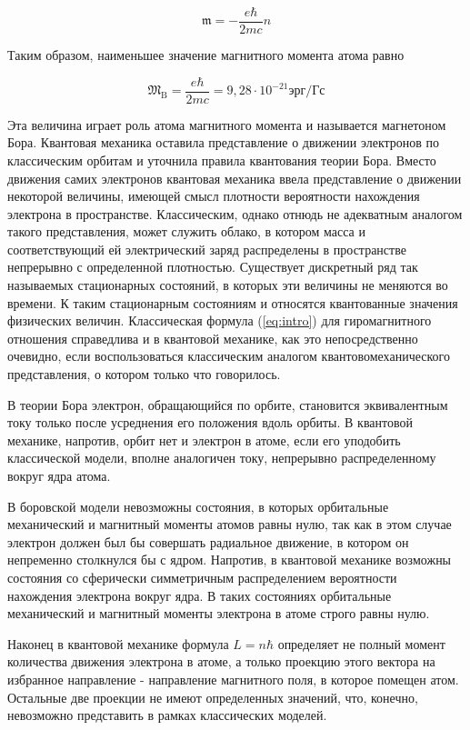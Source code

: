 \documentclass[12pt]{article}
\begin{document}
  \begin{equation}
    \mathfrak{m}=-\frac{e \hbar}{2 m c} n
  \end{equation}


  Таким образом, наименьшее значение магнитного момента атома равно

  \begin{equation}
    \mathfrak{M}_{\mathrm{B}}=\frac{e \hbar}{2 m c}=9,28 \cdot 10^{-21} \text{эрг} / \text{Гс}
  \end{equation}

  Эта величина играет роль атома магнитного момента и называется магнетоном Бора.
  Квантовая механика оставила представление о движении электронов по классическим орбитам и уточнила правила квантования теории Бора. Вместо движения самих электронов квантовая механика ввела представление о движении некоторой величины, имеющей смысл плотности вероятности нахождения электрона в пространстве. Классическим, однако отнюдь не адекватным аналогом такого представления, может служить облако, в котором масса и соответствующий ей электрический заряд распределены в пространстве непрерывно с определенной плотностью. Существует дискретный ряд так называемых стационарных состояний, в которых эти величины не меняются во времени. К таким стационарным состояниям и относятся квантованные значения физических величин. Классическая формула (\ref{eq:intro}) для гиромагнитного отношения справедлива и в квантовой механике, как это непосредственно очевидно, если воспользоваться классическим аналогом квантовомеханического представления, о котором только что говорилось.

  В теории Бора электрон, обращающийся по орбите, становится эквивалентным току только после усреднения его положения вдоль орбиты. В квантовой механике, напротив, орбит нет и электрон в атоме, если его уподобить классической модели, вполне аналогичен току, непрерывно распределенному вокруг ядра атома.

  В боровской модели невозможны состояния, в которых орбитальные механический и магнитный моменты атомов равны нулю, так как в этом случае электрон должен был бы совершать радиальное движение, в котором он непременно столкнулся бы с ядром. Напротив, в квантовой механике возможны состояния со сферически симметричным распределением вероятности нахождения электрона вокруг ядра. В таких состояниях орбитальные механический и магнитный моменты электрона в атоме строго равны нулю.


  Наконец в квантовой механике формула $L=n \hbar$ определяет не полный момент количества движения электрона в атоме, а только проекцию этого вектора на избранное направление - направление магнитного поля, в которое помещен атом. Остальные две проекции не имеют определенных значений, что, конечно, невозможно представить в рамках классических моделей.
\end{document}
